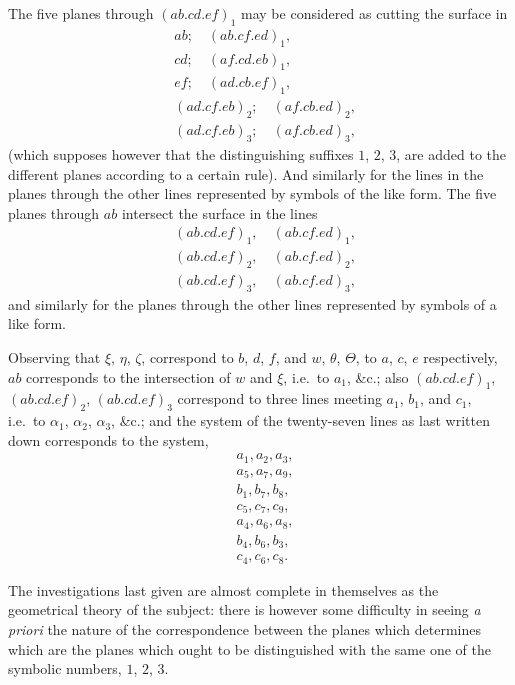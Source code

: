 \documentclass[11pt,a4paper]{article}
\theoremstyle{definition}
\begin{document}
The five planes through $(ab.cd.ef)_{1}$ may be considered as cutting the surface in
\begin{align*}
&ab; \quad (ab.cf.ed)_{1}, \\
&cd; \quad (af.cd.eb)_{1}, \\
&ef; \quad (ad.cb.ef)_{1}, \\
&(ad.cf.eb)_{2}; \quad (af.cb.ed)_{2}, \\
&(ad.cf.eb)_{3}; \quad (af.cb.ed)_{3},
\end{align*}
(which supposes however that the distinguishing suffixes $1$, $2$, $3$, are added to the different planes according to a certain rule). And similarly for the lines in the planes through the other lines represented by symbols of the like form. The five planes through $ab$ intersect the surface in the lines
\begin{align*}
&(ab.cd.ef)_{1}, \quad (ab.cf.ed)_{1}, \\
&(ab.cd.ef)_{2}, \quad (ab.cf.ed)_{2}, \\
&(ab.cd.ef)_{3}, \quad (ab.cf.ed)_{3},
\end{align*}
and similarly for the planes through the other lines represented by symbols of a like form.

Observing that $\xi$, $\eta$, $\zeta$, correspond to $b$, $d$, $f$, and $w$, $\theta$, $\Theta$, to $a$, $c$, $e$ respectively, $ab$ corresponds to the intersection of $w$ and $\xi$, i.e.\ to $a_{1}$, \&c.; also $(ab.cd.ef)_{1}$, $(ab.cd.ef)_{2}$, $(ab.cd.ef)_{3}$ correspond to three lines meeting $a_{1}$, $b_{1}$, and $c_{1}$, i.e.\ to $\alpha_{1}$, $\alpha_{2}$, $\alpha_{3}$, \&c.; and the system of the twenty-seven lines as last written down corresponds to the system,
\begin{align*}
&a_{1}, a_{2}, a_{3}, \\
&a_{5}, a_{7}, a_{9}, \\
&b_{1}, b_{7}, b_{8}, \\
&c_{5}, c_{7}, c_{9}, \\
&a_{4}, a_{6}, a_{8}, \\
&b_{4}, b_{6}, b_{3}, \\
&c_{4}, c_{6}, c_{8}.
\end{align*}

The investigations last given are almost complete in themselves as the geometrical theory of the subject: there is however some difficulty in seeing \textit{a priori} the nature of the correspondence between the planes which determines which are the planes which ought to be distinguished with the same one of the symbolic numbers, $1$, $2$, $3$.
\end{document}
